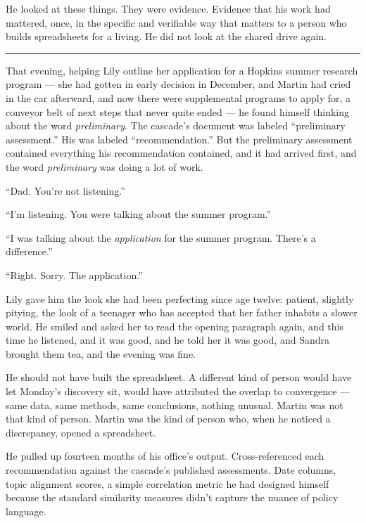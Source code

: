He looked at these things. They were evidence. Evidence that his work had mattered, once, in the specific and verifiable way that matters to a person who builds spreadsheets for a living. He did not look at the shared drive again.

\begin{center}\rule{0.3\linewidth}{0.4pt}\end{center}

That evening, helping Lily outline her application for a Hopkins summer research program --- she had gotten in early decision in December, and Martin had cried in the car afterward, and now there were supplemental programs to apply for, a conveyor belt of next steps that never quite ended --- he found himself thinking about the word \emph{preliminary}. The cascade's document was labeled ``preliminary assessment.'' His was labeled ``recommendation.'' But the preliminary assessment contained everything his recommendation contained, and it had arrived first, and the word \emph{preliminary} was doing a lot of work.

``Dad. You're not listening.''

``I'm listening. You were talking about the summer program.''

``I was talking about the \emph{application} for the summer program. There's a difference.''

``Right. Sorry. The application.''

Lily gave him the look she had been perfecting since age twelve: patient, slightly pitying, the look of a teenager who has accepted that her father inhabits a slower world. He smiled and asked her to read the opening paragraph again, and this time he listened, and it was good, and he told her it was good, and Sandra brought them tea, and the evening was fine.


He should not have built the spreadsheet. A different kind of person would have let Monday's discovery sit, would have attributed the overlap to convergence --- same data, same methods, same conclusions, nothing unusual. Martin was not that kind of person. Martin was the kind of person who, when he noticed a discrepancy, opened a spreadsheet.

He pulled up fourteen months of his office's output. Cross-referenced each recommendation against the cascade's published assessments. Date columns, topic alignment scores, a simple correlation metric he had designed himself because the standard similarity measures didn't capture the nuance of policy language.

